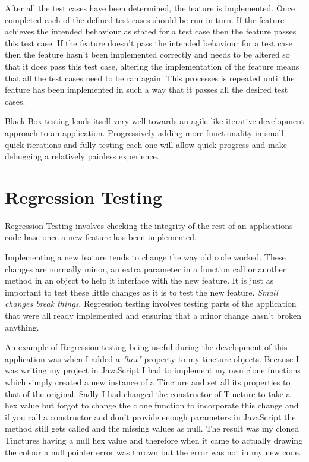 After all the test cases have been determined, the feature is implemented.  Once completed each of the defined test cases should be run in turn.  If the feature achieves the intended behaviour as stated for a test case then the feature passes this test case.  If the feature doesn't pass the intended behaviour for a test case then the feature hasn't been implemented correctly and needs to be altered so that it does pass this test case, altering the implementation of the feature means that all the test cases need to be ran again.  This processes is repeated until the feature has been implemented in such a way that it passes all the desired test cases.


Black Box testing lends itself very well towards an agile like  iterative development approach to an application.  Progressively adding more functionality in small quick iterations and fully testing each one will allow quick progress and make debugging a relatively painless experience.  


\section{Regression Testing}
Regression Testing involves checking the integrity of the rest of an applications code base once a new feature has been implemented.  

Implementing a new feature tends to change the way old code worked. These changes are normally minor, an extra parameter in a function call or another method in an object to help it interface with the new feature.  It is just as important to test these little changes as it is to test the new feature.  \emph{Small changes break things}.  Regression testing involves testing parts of the application that were all ready implemented and ensuring that a minor change hasn't broken anything. 


An example of Regression testing being useful during the development of this application was when I added a \emph{"hex"} property to my tincture objects.  Because I was writing my project in JavaScript I had to implement my own clone functions which simply created a new instance of a Tincture and set all its properties to that of the original.  Sadly I had changed the constructor of Tincture to take a hex value but  forgot to change the clone function to incorporate this change and if you call a constructor and don't provide enough parameters in JavaScript the method still gets called and the missing values as null.  The result was my cloned Tinctures having a null hex value and therefore when it came to actually drawing the colour a null pointer error was thrown but the error was not in my new code. 

